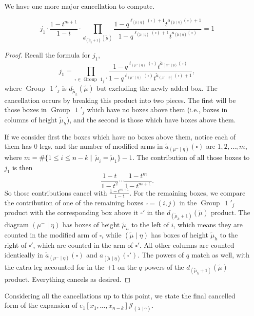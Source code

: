 \documentclass[ALCO]{cedram}
\newcommand{\JJ}{\mathcal{J}_{(\lambda \mid \gamma)}}
\newcommand{\mutilde}{{\widetilde{\mu}}}
\newcommand{\mumineta}{(\mu^- \mid \eta)}
\newcommand{\mutildeeta}{{(\mutilde \mid \eta)}}
\newcommand{\leg}[1]{{\ell_{#1}(\square)}}
\newcommand{\armone}[1]{{\widetilde{a}_{#1}(\square)}}
\newcommand{\armtwo}[1]{{a_{#1}(\square)}}
\newcommand{\group}[1]{\operatorname{Group}\,\operatorname{#1}}
\newcommand{\jone}{j_1}
\begin{document}
We have one more major cancellation to compute.

\begin{prop}
\[ \jone \cdot \frac{1-t^{m+1}}{1-t} \cdot \prod_{d_{(\mutilde_h+1)}(\mutilde)} \frac{1-q^{\leg{\mutildeeta}+1}t^{\armtwo{\mutildeeta}+1}}{1-q^{\leg{\mutildeeta}+1}t^{\armtwo{\mutildeeta}}} = 1\]
\end{prop}
\begin{proof}
Recall the formula for $\jone$,
\[ \jone = \prod_{\square \in \group{1}_j'} \frac{1-q^{\leg{\mumineta}}t^{\armone{\mumineta}}}{1-q^{\leg{\mumineta}}t^{\armone{\mumineta}+1}},\]
where $\group{1}'_j$ is $d_{\mutilde_h}(\mutilde)$ but excluding the newly-added box. The cancellation occurs by breaking this product into two pieces. The first will be those boxes in $\group{1}'_j$ which have no boxes above them (i.e., boxes in columns of height $\mutilde_h$), and the second is those which have boxes above them.

If we consider first the boxes which have no boxes above them, notice each of them has 0 legs, and the number of modified arms in $\armone{\mumineta}$ are $1, 2, \dotsc, m$, where $m = \#\{ 1\leq i \leq n-k \mid \, \mutilde_i = \mutilde_1  \}-1$. The contribution of all those boxes to $\jone$ is then
\[ \frac{1-t}{1-t^2}\dotsm \frac{1-t^m}{1-t^{m+1}}. \]
So those contributions cancel with $\frac{1-t^{m+1}}{1-t}$. For the remaining boxes, we compare the contribution of one of the remaining boxes $\square = (i,j)$ in the $\group{1}'_j$ product with the corresponding box above it $\square'$ in the $d_{(\mutilde_h+1)}(\mutilde)$ product. The diagram $\mumineta$ has boxes of height $\mutilde_h$ to the left of $i$, which means they are counted in the modified arm of $\square$, while $\mutildeeta$ has boxes of height $\mutilde_h$ to the right of $\square'$, which are counted in the arm of $\square'$. All other columns are counted identically in $\armone{\mumineta}$ and $a_\mutildeeta(\square')$. The powers of $q$ match as well, with the extra leg accounted for in the $+1$ on the $q$-powers of the $d_{(\mutilde_h+1)}(\mutilde)$ product. Everything cancels as desired.
\end{proof}

Considering all the cancellations up to this point, we state the final cancelled form of the expansion of $e_1[x_1,\dotsc,x_{n-k}] \JJ$.
\end{document}
